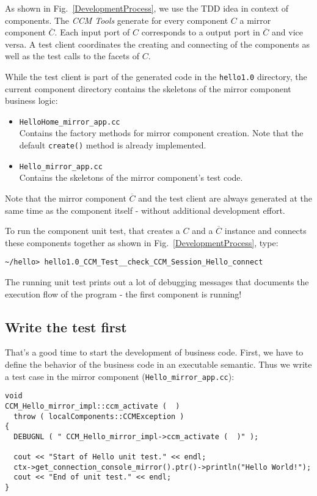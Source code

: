 As shown in Fig.~\ref{DevelopmentProcess}, we use the TDD idea in context of components.
The {\it CCM Tools} generate for every component $C$ a mirror component $\overline{C}$.
Each input port of $C$ corresponds to a output port in $\overline{C}$ and vice versa.
A test client coordinates the creating and connecting of the components as well as the
test calls to the facets of $C$.  

While the test client is part of the generated code in the {\tt hello1.0} directory,
the current component directory contains the skeletons of the mirror component business
logic:
\begin{itemize}
\item {\tt HelloHome\_mirror\_app.cc} \\
Contains the factory methods for mirror component creation.
Note that the default {\tt create()} method is already implemented.
\item {\tt Hello\_mirror\_app.cc} \\
Contains the skeletons of the mirror component's test code.
\end{itemize}

\noindent
Note that the mirror component $\overline{C}$ and the test client are always generated 
at the same time as the component itself - without additional development effort.

\noindent
To run the component unit test, that creates a $C$ and a 
$\overline{C}$ instance and connects these components together as shown in 
Fig.~\ref{DevelopmentProcess}, type:
\begin{verbatim}
~/hello> hello1.0_CCM_Test__check_CCM_Session_Hello_connect
\end{verbatim} 
The running unit test prints out a lot of debugging messages
that documents the execution flow of the program - the first component is running!



\subsection{Write the test first}

That's a good time to start the development of business code.
First, we have to define the behavior of the business code in an executable
semantic.
Thus we write a test case in the mirror component ({\tt Hello\_mirror\_app.cc}):
\begin{verbatim}
void
CCM_Hello_mirror_impl::ccm_activate (  )
  throw ( localComponents::CCMException )
{
  DEBUGNL ( " CCM_Hello_mirror_impl->ccm_activate (  )" );

  cout << "Start of Hello unit test." << endl;
  ctx->get_connection_console_mirror().ptr()->println("Hello World!");
  cout << "End of unit test." << endl;
}
\end{verbatim}

